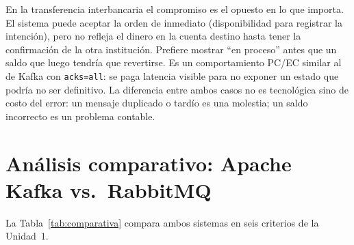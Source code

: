 \documentclass[11pt,a4paper]{article}
\begin{document}
En la transferencia interbancaria el compromiso es el opuesto en lo que importa. El sistema puede aceptar la orden de inmediato (disponibilidad para registrar la intención), pero no refleja el dinero en la cuenta destino hasta tener la confirmación de la otra institución. Prefiere mostrar \enquote{en proceso} antes que un saldo que luego tendría que revertirse. Es un comportamiento PC/EC similar al de Kafka con \texttt{acks=all}: se paga latencia visible para no exponer un estado que podría no ser definitivo. La diferencia entre ambos casos no es tecnológica sino de costo del error: un mensaje duplicado o tardío es una molestia; un saldo incorrecto es un problema contable.

\section{Análisis comparativo: Apache Kafka vs.\ RabbitMQ}
\label{sec:comparativa}

La Tabla~\ref{tab:comparativa} compara ambos sistemas en seis criterios de la Unidad~1.
\end{document}
